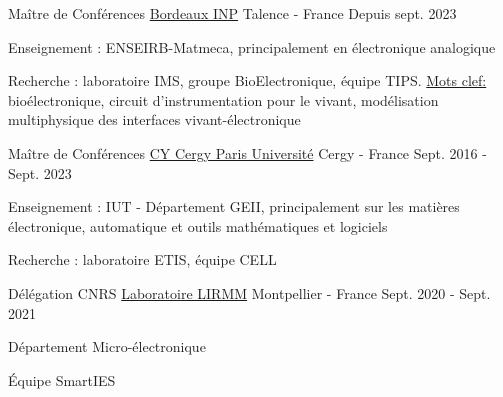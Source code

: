 

\begin{cventries}

\cventry
{Maître de Conférences} %
{\href{https://www.bordeaux-inp.fr/fr}{Bordeaux INP}} %
{Talence - France} %
{Depuis sept. 2023} %
{
  \begin{cvitems} %
    \item {Enseignement : ENSEIRB-Matmeca, principalement en électronique analogique}
    \item {Recherche : laboratoire IMS, groupe BioElectronique, équipe TIPS. \underline{Mots clef:} bioélectronique, circuit d'instrumentation pour le vivant, modélisation multiphysique des interfaces vivant-électronique}
  \end{cvitems}
}

  \cventry
    {Maître de Conférences} %
    {\href{www.cyu.fr}{CY Cergy Paris Université}} %
    {Cergy - France} %
    {Sept. 2016 - Sept. 2023} %
    {
      \begin{cvitems} %
        \item {Enseignement : IUT - Département GEII, principalement sur les matières électronique, automatique et outils mathématiques et logiciels}
        \item {Recherche : laboratoire ETIS, équipe CELL}
      \end{cvitems}
    }
    
  \cventry
    {Délégation CNRS} %
    {\href{https://www.lirmm.fr}{Laboratoire LIRMM}} %
    {Montpellier - France} %
    {Sept. 2020 - Sept. 2021} %
    {
      \begin{cvitems} %
        \item {Département Micro-électronique}
        \item {Équipe SmartIES}
      \end{cvitems}
    }


\end{cventries}
